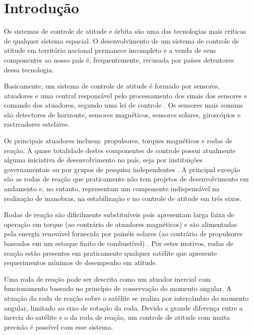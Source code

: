\cleardoublepage

\pagestyle{fancy}


\chapter{Introdução}\label{intro}

Os sistemas de controle de atitude e órbita são uma das tecnologias mais críticas de qualquer sistema espacial. O desenvolvimento de um sistema de controle de atitude em território nacional permanece incompleto \citep{Veloso2009} e a venda de seus componentes ao nosso país é, frequentemente, recusada por países detentores dessa tecnologia.

Basicamente, um sistema de controle de atitude é formado por sensores, atuadores e uma central responsável pelo processamento dos sinais dos sensores e comando dos atuadores, segundo uma lei de controle \citep{Rycroft1992a}. Os sensores mais comuns são detectores de horizonte, sensores magnéticos, sensores solares, giroscópios e rastreadores estelares. 

Os principais atuadores incluem: propulsores, torques magnéticos e rodas de reação. A quase totalidade destes componentes de controle possui atualmente alguma iniciativa de desenvolvimento no país, seja por instituições governamentais ou por grupos de pesquisa independentes \citep{PresidenciaRepublica}. A principal exceção são as rodas de reação que praticamente não tem projetos de desenvolvimento em andamento e, no entanto, representam um componente indispensável na realização de manobras, na estabilização e no controle de atitude em três eixos. 

Rodas de reação são dificilmente substituíveis pois apresentam larga faixa de operação em torque (ao contrário de atuadores magnéticos) e são alimentadas pela energia renovável fornecida por painéis solares (ao contrário de propulsores baseados em um estoque finito de combustível) \cite{Ismail2010a}. Por estes motivos, rodas de reação estão presentes em praticamente qualquer satélite que apresente requerimentos mínimos de desempenho em atitude.

Uma roda de reação pode ser descrita como um atuador inercial com funcionamento baseado no princípio de conservação do momento angular. A atuação da roda de reação sobre o satélite se realiza por intercâmbio do momento angular, limitado ao eixo de rotação da roda. Devido a grande diferença entre a inercia do satélite e o da roda de reação, um controle de atitude com muita precisão é possível com esse sistema.

